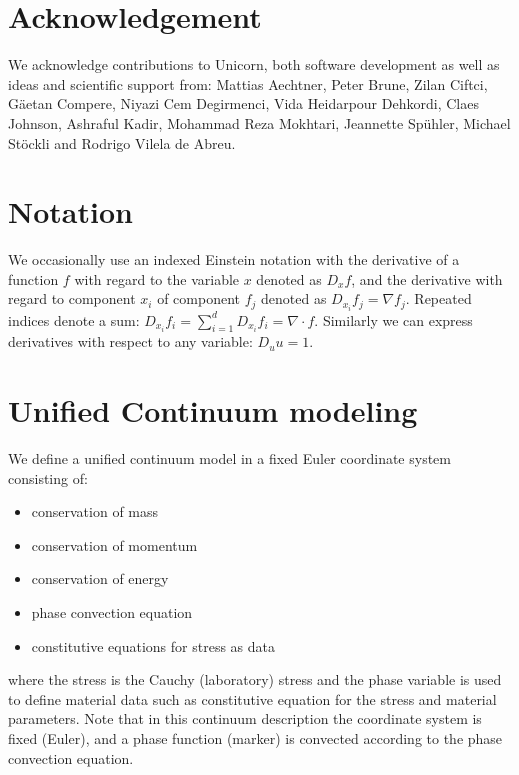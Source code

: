 

\section{Acknowledgement}

We acknowledge contributions to Unicorn, both software development as
well as ideas and scientific support from: Mattias Aechtner, Peter
Brune, Zilan Ciftci, G\"aetan Compere, Niyazi Cem Degirmenci, Vida
Heidarpour Dehkordi, Claes Johnson, Ashraful Kadir, Mohammad Reza
Mokhtari, Jeannette Sp\"uhler, Michael St\"ockli and Rodrigo Vilela de
Abreu.

\section{Notation}

We occasionally use an indexed Einstein notation with the derivative of a
function $f$ with regard to the variable $x$ denoted as $D_x f$, and
the derivative with regard to component $x_i$ of component $f_j$
denoted as $D_{x_i} f_j = \nabla f_j$. Repeated indices denote a sum:
$D_{x_i} f_i = \sum_{i=1}^d D_{x_i} f_i = \nabla \cdot f$. Similarly
we can express derivatives with respect to any variable: $D_u u = 1$.
\section{Unified Continuum modeling}


We define a unified continuum model in a fixed Euler
coordinate system consisting of:
\begin{itemize}
\item
conservation of mass
\item
conservation of momentum
\item
conservation of energy
\item
phase convection equation
\item
constitutive equations for stress as data
\end{itemize}
where the stress is the Cauchy (laboratory) stress and the phase
variable is used to define material data such as constitutive equation
for the stress and material parameters. Note that in this continuum
description the coordinate system is fixed (Euler), and a phase
function (marker) is convected according to the phase convection
equation.

